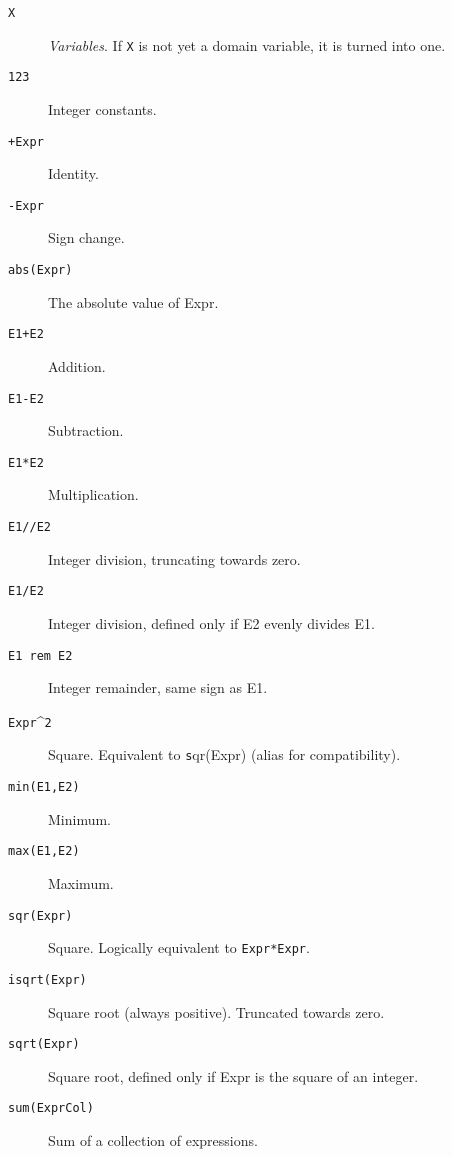 \begin{description}
\item[\texttt{X}]
	    \emph{Variables}.  If \verb'X' is not yet a domain variable, it is turned 
	    into one.

\item[\texttt{123}]
	    Integer constants.

\item[\texttt{+Expr}]
	    Identity.

\item[\texttt{-Expr}]
	    Sign change.

\item[\texttt{abs(Expr)}]
    The absolute value of Expr.

\item[\texttt{E1+E2}]
    Addition.

\item[\texttt{E1-E2}]
    Subtraction.

\item[\texttt{E1*E2}]
    Multiplication.

\item[\texttt{E1//E2}]
    Integer division, truncating towards zero.

\item[\texttt{E1/E2}]
    Integer division, defined only if E2 evenly divides E1.

\item[\texttt{E1 rem E2}]
	    Integer remainder, same sign as E1.

\item[\texttt{Expr}\textasciicircum{}{\texttt 2}]
	    Square. Equivalent to {\texttt sqr(Expr)} (alias for compatibility).


\item[\texttt{min(E1,E2)}]
    Minimum.

\item[\texttt{max(E1,E2)}]
    Maximum.

\item[\texttt{sqr(Expr)}]
    Square. Logically equivalent to \verb|Expr*Expr|.

\item[\texttt{isqrt(Expr)}]
	    Square root (always positive). Truncated towards zero.

\item[\texttt{sqrt(Expr)}]
	    Square root, defined only if Expr is the square of an integer.

\item[\texttt{sum(ExprCol)}]
	    Sum of a collection of expressions.


\end{description}
